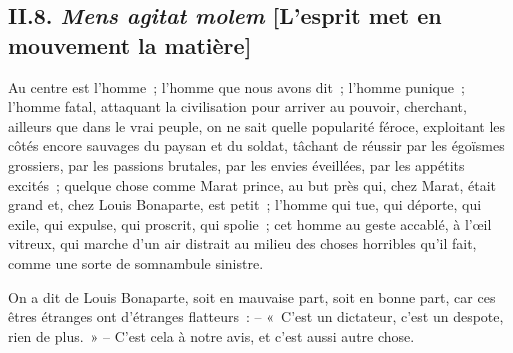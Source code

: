\documentclass[french,twoside]{book} %
\begin{document}
\subsection[{II.8. Mens agitat molem [L’esprit met en mouvement la matière]}]{II.8. \emph{Mens agitat molem} [L’esprit met en mouvement la matière]}
\noindent Au centre est l’homme ; l’homme que nous avons dit ; l’homme punique ; l’homme fatal, attaquant la civilisation pour arriver au pouvoir, cherchant, ailleurs que dans le vrai peuple, on ne sait quelle popularité féroce, exploitant les côtés encore sauvages du paysan et du soldat, tâchant de réussir par les égoïsmes grossiers, par les passions brutales, par les envies éveillées, par les appétits excités ; quelque chose comme Marat prince, au but près qui, chez Marat, était grand et, chez Louis Bonaparte, est petit ; l’homme qui tue, qui déporte, qui exile, qui expulse, qui proscrit, qui spolie ; cet homme au geste accablé, à l’œil vitreux, qui marche d’un air distrait au milieu des choses horribles qu’il fait, comme une sorte de somnambule sinistre.\par
On a dit de Louis Bonaparte, soit en mauvaise part, soit en bonne part, car ces êtres étranges ont d’étranges flatteurs : – « C’est un dictateur, c’est un despote, rien de plus. » – C’est cela à notre avis, et c’est aussi autre chose.\par
\end{document}
